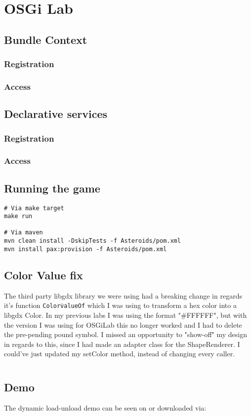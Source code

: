 \section{OSGi Lab}
% 

\subsection{Bundle Context}
\subsubsection{Registration}
\subsubsection{Access}

\subsection{Declarative services}
\subsubsection{Registration}
\subsubsection{Access}

\subsection{Running the game}
\begin{verbatim}
# Via make target
make run

# Via maven
mvn clean install -DskipTests -f Asteroids/pom.xml
mvn install pax:provision -f Asteroids/pom.xml
\end{verbatim}

\subsection{Color Value fix}
The third party libgdx library we were using had a breaking change in regards
it's function \texttt{Color\.valueOf} which I was using to transform a hex color
into a libgdx Color. In my previous labs I was using the format "\#FFFFFF", but
with the version I was using for OSGiLab this no longer worked and I had to
delete the pre-pending pound symbol.
I missed an opportunity to "show-off" my design in regards to this, since I had
made an adapter class for the ShapeRenderer. I could've just updated my setColor
method, instead of changing every caller.

\inputminted{java}{code/color-value-fix.java}


\subsection{Demo}
The dynamic load-unload demo can be seen on
 or downloaded via:
